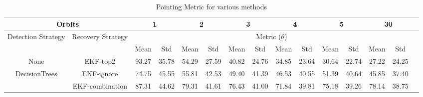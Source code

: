 \begin{table*}[] 
\label{Table: Pointing Metric-Reflection} 
\caption{Pointing Metric for various methods} 
\centering 
\begin{tabular} 
 {@{}ccccccccccccccc@{}} 
\toprule 
\multicolumn{2}{c}{\textbf{Orbits}} & 
\multicolumn{2}{c}{\textbf{1}} & 
\multicolumn{2}{c}{\textbf{2}} & 
\multicolumn{2}{c}{\textbf{3}} & 
\multicolumn{2}{c}{\textbf{4}} & 
\multicolumn{2}{c}{\textbf{5}} & 
\multicolumn{2}{c}{\textbf{30}}
 \\ \midrule 
\multicolumn{1}{|c|}{\multirow{2}{*}{Detection Strategy}} & 
\multicolumn{1}{c|}{\multirow{2}{*}{Recovery Strategy}} & 
\multicolumn{12}{c|}{Metric ($\theta$)}
 \\ \cmidrule(l){3-14} 
\multicolumn{1}{|c|}{} & 
\multicolumn{1}{c|}{} & 
\multicolumn{1}{c|}{Mean} & 
\multicolumn{1}{c|}{Std} & 
\multicolumn{1}{c|}{Mean} & 
\multicolumn{1}{c|}{Std} & 
\multicolumn{1}{c|}{Mean} & 
\multicolumn{1}{c|}{Std} & 
\multicolumn{1}{c|}{Mean} & 
\multicolumn{1}{c|}{Std} & 
\multicolumn{1}{c|}{Mean} & 
\multicolumn{1}{c|}{Std} & 
\multicolumn{1}{c|}{Mean} & 
\multicolumn{1}{c|}{Std}
 \\ \midrule 
\multicolumn{1}{|c|}{None} & 
\multicolumn{1}{c|}{EKF-top2} & 
\multicolumn{1}{c|}{93.27} & 
\multicolumn{1}{c|}{35.78} & 
\multicolumn{1}{c|}{54.29} & 
\multicolumn{1}{c|}{27.59} & 
\multicolumn{1}{c|}{40.82} & 
\multicolumn{1}{c|}{24.76} & 
\multicolumn{1}{c|}{34.85} & 
\multicolumn{1}{c|}{23.64} & 
\multicolumn{1}{c|}{30.64} & 
\multicolumn{1}{c|}{22.74} & 
\multicolumn{1}{c|}{27.22} & 
\multicolumn{1}{c|}{24.25}
 \\ \midrule 
\multicolumn{1}{|c|}{\multirow{3}{*}{DecisionTrees}} & 
\multicolumn{1}{c|}{EKF-ignore} & 
\multicolumn{1}{c|}{74.75} & 
\multicolumn{1}{c|}{45.55} & 
\multicolumn{1}{c|}{55.81} & 
\multicolumn{1}{c|}{42.53} & 
\multicolumn{1}{c|}{49.40} & 
\multicolumn{1}{c|}{41.39} & 
\multicolumn{1}{c|}{46.53} & 
\multicolumn{1}{c|}{40.55} & 
\multicolumn{1}{c|}{51.39} & 
\multicolumn{1}{c|}{40.64} & 
\multicolumn{1}{c|}{45.85} & 
\multicolumn{1}{c|}{37.40}
 \\ \cmidrule(l){2-14} 
\multicolumn{1}{|c|}{} & 
\multicolumn{1}{c|}{EKF-combination} & 
\multicolumn{1}{c|}{87.31} & 
\multicolumn{1}{c|}{44.62} & 
\multicolumn{1}{c|}{79.31} & 
\multicolumn{1}{c|}{41.61} & 
\multicolumn{1}{c|}{76.43} & 
\multicolumn{1}{c|}{41.00} & 
\multicolumn{1}{c|}{71.84} & 
\multicolumn{1}{c|}{39.81} & 
\multicolumn{1}{c|}{75.18} & 
\multicolumn{1}{c|}{39.26} & 
\multicolumn{1}{c|}{78.14} & 
\multicolumn{1}{c|}{38.75}

\end{tabular}
\end{table*}
